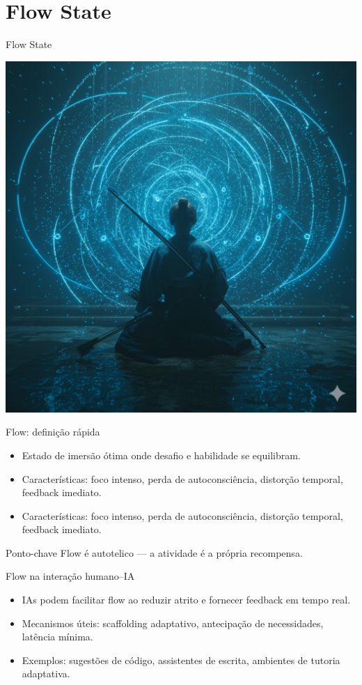 \documentclass[aspectratio=169,12pt]{beamer}
\begin{document}
\section{ Flow State}
\begin{frame}{Flow State}
    \begin{center}
\includegraphics[scale=0.15]{mestrezen-flowstate.png}\end{center}
\end{frame} 
\begin{frame}{Flow: definição rápida}
  \begin{itemize}
    \item Estado de imersão ótima onde desafio e habilidade se equilibram.
    \item Características: foco intenso, perda de autoconsciência, distorção temporal, feedback imediato. 
    \item Características: foco intenso, perda de autoconsciência, distorção temporal, feedback imediato. \faBolt
  \end{itemize}
    \begin{exampleblock}{Ponto-chave}
        Flow é autotelico — a atividade é a própria recompensa.
    \end{exampleblock}
\end{frame}

\begin{frame}{Flow na interação humano–IA}
  \begin{itemize}
    \item IAs podem facilitar flow ao reduzir atrito e fornecer feedback em tempo real.
    \item Mecanismos úteis: scaffolding adaptativo, antecipação de necessidades, latência mínima.
    \item Exemplos: sugestões de código, assistentes de escrita, ambientes de tutoria adaptativa.
  \end{itemize}
\end{frame}
\end{document}

